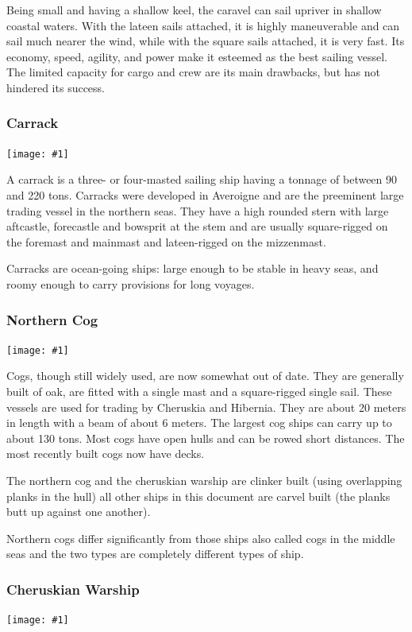 \documentclass[a4paper]{dnd5}
\newcommand\inc[1]{
 \texttt{[image: \#1]}
}
\begin{document}
Being small and having a shallow keel, the caravel can sail upriver in shallow coastal waters. With the lateen sails attached, it is highly maneuverable and can sail much nearer the wind, while with the square sails attached, it is very fast. Its economy, speed, agility, and power make it esteemed as the best sailing vessel. The limited capacity for cargo and crew are its main drawbacks, but has not hindered its success.


\subsubsection*{Carrack}

\inc{carrack.jpg}

A carrack is a three- or four-masted sailing ship having a tonnage of between 90 and 220 tons.  Carracks were developed in Averoigne and are the preeminent large trading vessel in the northern seas. They have a high rounded stern with large aftcastle, forecastle and bowsprit at the stem and are usually square-rigged on the foremast and mainmast and lateen-rigged on the mizzenmast.

Carracks are ocean-going ships: large enough to be stable in heavy seas, and roomy enough to carry provisions for long voyages. 


\subsubsection*{Northern Cog}

\inc{northern_cog.jpg}

Cogs, though still widely used, are now somewhat out of date.  They are generally built of oak, are fitted with a single mast and a square-rigged single sail. These vessels are used for trading by Cheruskia and Hibernia. They are about 20 meters in length with a beam of about 6 meters.  The largest cog ships can carry up to about 130 tons.  Most cogs have open hulls and can be rowed short distances. The most recently built cogs now have decks.

The northern cog and the cheruskian warship are clinker built (using overlapping planks in the hull) all other ships in this document are carvel built (the planks butt up against one another).

Northern cogs differ significantly from those ships also called cogs in the middle seas and the two types are completely different types of ship.


\subsubsection*{Cheruskian Warship}
\inc{cheruskian_warship.jpg}
\end{document}
